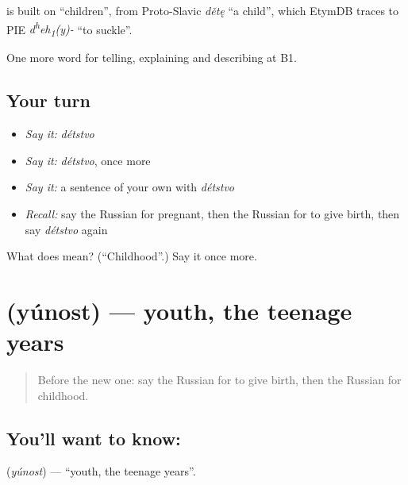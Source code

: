 \begin{cousinweb}
\emph{} is built on \emph{} \textquotedblleft{}children\textquotedblright{}, from Proto-Slavic \emph{dětę} \textquotedblleft{}a child\textquotedblright{}, which EtymDB traces to PIE \emph{d\textsuperscript{h}eh\textsubscript{1}(y)-} \textquotedblleft{}to suckle\textquotedblright{}.
\end{cousinweb}

\begin{grammarlens}[title={What you've built}]
One more word for telling, explaining and describing at B1.
\end{grammarlens}

\subsection*{Your turn}
\begin{itemize}
\raggedright
  \item \emph{Say it:} \emph{détstvo}
  \item \emph{Say it:} \emph{détstvo}, once more
  \item \emph{Say it:} a sentence of your own with \emph{détstvo}
  \item \emph{Recall:} say the Russian for pregnant, then the Russian for to give birth, then say \emph{détstvo} again
\end{itemize}

\begin{tcolorbox}[breakable,colback=teal!4,colframe=teal!35!black,title={Before you move on}]
What does  mean? (\textquotedblleft{}Childhood\textquotedblright{}.) Say it once more.
\end{tcolorbox}
\section[\texorpdfstring{\ru{юность} (yúnost)}{юность (yúnost)}]{ (yúnost) — youth, the teenage years}

\label{lesson:RU-C304-yunost}



\begin{quote}
Before the new one: say the Russian for to give birth, then the Russian for childhood.
\end{quote}

\subsection*{You'll want to know: }
\textbf{} (\emph{yúnost}) — \textquotedblleft{}youth, the teenage years\textquotedblright{}.

